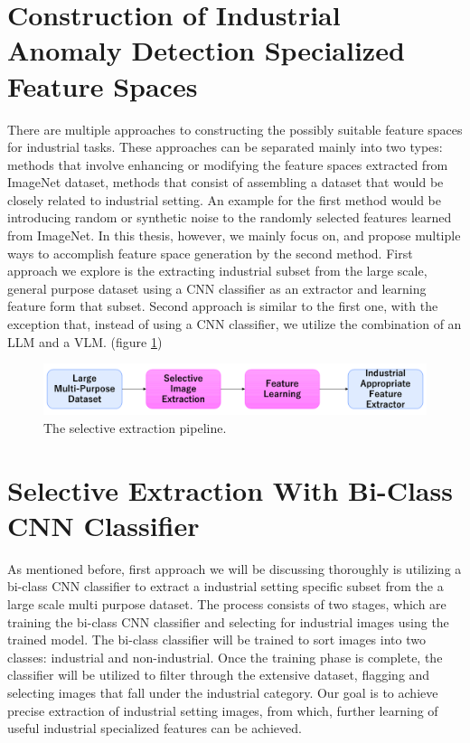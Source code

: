 \section{Construction of Industrial Anomaly Detection Specialized Feature Spaces}
There are multiple approaches to constructing the possibly suitable feature spaces for industrial tasks. These approaches can be separated mainly into two types: methods that involve enhancing or modifying the feature spaces extracted from ImageNet dataset, methods that consist of assembling a dataset that would be closely related to industrial setting. An example for the first method would be introducing random or synthetic noise to the randomly selected features learned from ImageNet\cite{realnet}\cite{glass}. In this thesis, however, we mainly focus on, and propose multiple ways to accomplish feature space generation by the second method. First approach we explore is the extracting industrial subset from the large scale, general purpose dataset\cite{yfcc100m} using a CNN classifier\cite{lenet} as an extractor and learning feature form that subset. Second approach is similar to the first one, with the exception that, instead of using a CNN classifier, we utilize the combination of an LLM\cite{llm_survey} and a VLM\cite{vlm_survey}. (figure \ref{fig:selective_extraction})

\begin{figure}[t]
	\begin{center}
		\includegraphics[width=1.0\linewidth]{Chapter_3/selective_extraction.png}
	\end{center}
	\caption{The selective extraction pipeline.}
	\label{fig:selective_extraction}
\end{figure} 	

\section{Selective Extraction With Bi-Class CNN Classifier}
\label{cnn extraction}
As mentioned before, first approach we will be discussing thoroughly is utilizing a bi-class CNN classifier to extract a industrial setting specific subset from the a large scale multi purpose dataset. The process consists of two stages, which are training the bi-class CNN classifier and selecting for industrial images using the trained model. The bi-class classifier will be trained to sort images into two classes: industrial and non-industrial. Once the training phase is complete, the classifier will be utilized to filter through the extensive dataset, flagging and selecting images that fall under the industrial category. Our goal is to achieve precise extraction of industrial setting images, from which, further learning of useful industrial specialized features can be achieved. 

